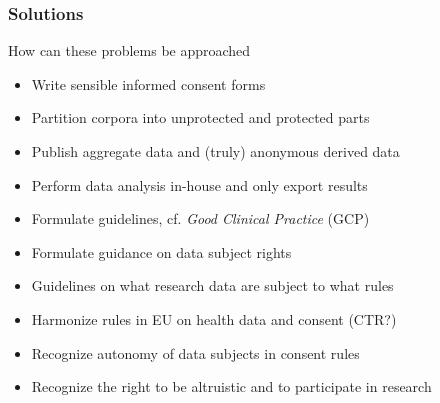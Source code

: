 \documentclass[xcolor=dvipsnames]{beamer}
\begin{document}
\begin{frame}
	\frametitle{Solutions \hspace{6.7cm}{\em do they exist?}}
	
	\begin{block}{How can these problems be approached}
	\begin{itemize}
	\item {\color{OliveGreen} Write sensible informed consent forms}
	\item {\color{OliveGreen} Partition corpora into unprotected and protected parts}
	\item {\color{OliveGreen} Publish aggregate data and (truly) anonymous derived data}
	\item {\color{OliveGreen} Perform data analysis in-house and only export results {\scriptsize\cite{budin2015datashield}}}
	\item {\color{MidnightBlue} Formulate guidelines, cf. {\em Good Clinical Practice} (GCP)}
	\item {\color{MidnightBlue} Formulate guidance on data subject rights}
	\item {\color{MidnightBlue} Guidelines on what research data are subject to what rules}
	\item {\color{Maroon} Harmonize rules in EU on health data and consent (CTR?)}
	\item {\color{Maroon} Recognize autonomy of data subjects in consent rules}
	\item {\color{Maroon} Recognize the right to be altruistic and to participate in research}
	\end{itemize}
	\end{block}	
\end{frame}
\end{document}
